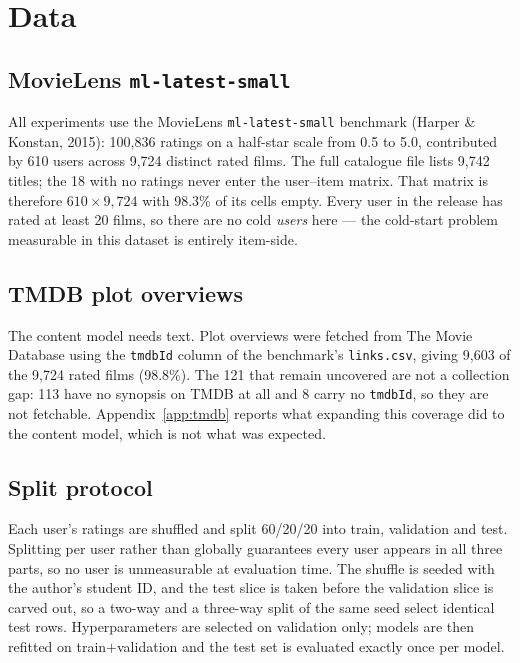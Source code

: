 \documentclass[10pt,twocolumn,letterpaper]{article}
\newif\ifdraftnotes
\newcommand{\TODO}[1]{\ifdraftnotes
  \par\noindent\fcolorbox{orange!60}{yellow!12}{%
    \parbox{0.95\linewidth}{\footnotesize\textbf{TODO}\ \textit{#1}}}\par\medskip
\fi}
\begin{document}
\TODO{Verify every reference against the original paper or its DOI before
submitting. Related Work is worth 10\% of the report mark; adding one or two
references you find yourself is worth the time.}

\section{Data}

\subsection{MovieLens \texttt{ml-latest-small}}
All experiments use the MovieLens \texttt{ml-latest-small} benchmark
(Harper \& Konstan, 2015): 100,836 ratings on a half-star scale from 0.5 to
5.0, contributed by 610 users across 9,724 distinct rated films. The full
catalogue file lists 9,742 titles; the 18 with no ratings never enter the
user--item matrix. That matrix is therefore $610 \times 9{,}724$ with 98.3\%
of its cells empty. Every user in the release has rated at least 20 films, so
there are no cold \emph{users} here --- the cold-start problem measurable in
this dataset is entirely item-side.

\subsection{TMDB plot overviews}
The content model needs text. Plot overviews were fetched from The Movie
Database using the \texttt{tmdbId} column of the benchmark's
\texttt{links.csv}, giving 9,603 of the 9,724 rated films (98.8\%). The 121
that remain uncovered are not a collection gap: 113 have no synopsis on TMDB
at all and 8 carry no \texttt{tmdbId}, so they are not fetchable.
Appendix~\ref{app:tmdb} reports what expanding this coverage did to the
content model, which is not what was expected.

\subsection{Split protocol}
Each user's ratings are shuffled and split 60/20/20 into train, validation and
test. Splitting per user rather than globally guarantees every user appears in
all three parts, so no user is unmeasurable at evaluation time. The shuffle is
seeded with the author's student ID, and the test slice is taken before the
validation slice is carved out, so a two-way and a three-way split of the same
seed select identical test rows. Hyperparameters are selected on validation
only; models are then refitted on train${+}$validation and the test set is
evaluated exactly once per model.
\end{document}
